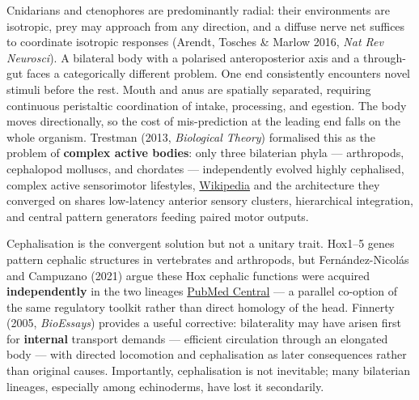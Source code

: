 Cnidarians and ctenophores are predominantly radial: their environments are isotropic, prey may approach from any direction, and a diffuse nerve net suffices to coordinate isotropic responses (Arendt, Tosches \& Marlow 2016, \emph{Nat Rev Neurosci}). A bilateral body with a polarised anteroposterior axis and a through-gut faces a categorically different problem. One end consistently encounters novel stimuli before the rest. Mouth and anus are spatially separated, requiring continuous peristaltic coordination of intake, processing, and egestion. The body moves directionally, so the cost of mis-prediction at the leading end falls on the whole organism. Trestman (2013, \emph{Biological Theory}) formalised this as the problem of \textbf{complex active bodies}: only three bilaterian phyla --- arthropods, cephalopod molluscs, and chordates --- independently evolved highly cephalised, complex active sensorimotor lifestyles, \href{https://en.wikipedia.org/wiki/Cephalization}{Wikipedia} and the architecture they converged on shares low-latency anterior sensory clusters, hierarchical integration, and central pattern generators feeding paired motor outputs.

Cephalisation is the convergent solution but not a unitary trait. Hox1--5 genes pattern cephalic structures in vertebrates and arthropods, but Fernández-Nicolás and Campuzano (2021) argue these Hox cephalic functions were acquired \textbf{independently} in the two lineages \href{https://pmc.ncbi.nlm.nih.gov/articles/PMC8374599/}{PubMed Central} --- a parallel co-option of the same regulatory toolkit rather than direct homology of the head. Finnerty (2005, \emph{BioEssays}) provides a useful corrective: bilaterality may have arisen first for \textbf{internal} transport demands --- efficient circulation through an elongated body --- with directed locomotion and cephalisation as later consequences rather than original causes. Importantly, cephalisation is not inevitable; many bilaterian lineages, especially among echinoderms, have lost it secondarily.

